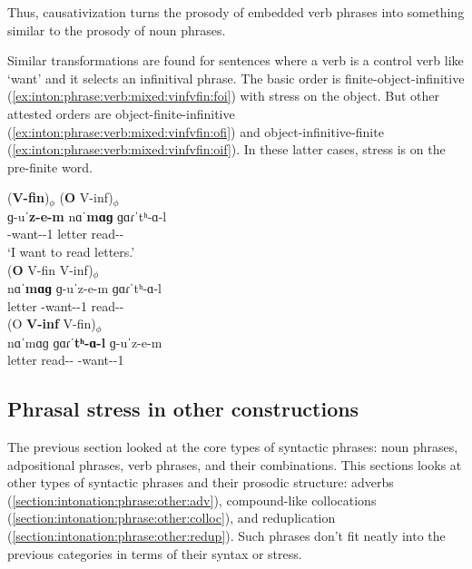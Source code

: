 Thus, causativization turns the prosody of embedded verb phrases into something similar to the prosody of noun phrases. 

Similar transformations are found for sentences where a verb is a control verb like `want' and it selects an infinitival phrase. The basic order is finite-object-infinitive (\ref{ex:inton:phrase:verb:mixed:vinfvfin:foi}) with stress on the object. But other attested orders are object-finite-infinitive (\ref{ex:inton:phrase:verb:mixed:vinfvfin:ofi}) and object-infinitive-finite (\ref{ex:inton:phrase:verb:mixed:vinfvfin:oif}). In these latter cases, stress is on the pre-finite word. 

\begin{exe}
	\ex \begin{xlist}
		\ex \glll (\textbf{V-fin})$_\phi$ (\textbf{O} V-inf)$_\phi$  \\
		ɡ-uˈ\textbf{z-e-m} nɑˈ\textbf{mɑɡ} ɡɑɾˈtʰ-ɑ-l \\
		{\ind}-want-{\thgloss}-1{\sg} letter read-{\thgloss}-{\infgloss} \\
		\trans `I want to read letters.' \label{ex:inton:phrase:verb:mixed:vinfvfin:foi} \\
		\ex \glll (\textbf{O} {V-fin} {V-inf})$_\phi$  \\
		nɑˈ\textbf{mɑɡ} ɡ-uˈ{z-e-m}  ɡɑɾˈ{tʰ-ɑ-l} \\
		letter {\ind}-want-{\thgloss}-1{\sg}  read-{\thgloss}-{\infgloss} \\
		 \label{ex:inton:phrase:verb:mixed:vinfvfin:ofi} 
		\ex \glll ({O} \textbf{V-inf}  V-fin)$_\phi$  \\
		nɑˈ{mɑɡ}  ɡɑɾˈ\textbf{tʰ-ɑ-l} ɡ-uˈ{z-e-m}  \\
		letter  read-{\thgloss}-{\infgloss} {\ind}-want-{\thgloss}-1{\sg}  \\
		 \label{ex:inton:phrase:verb:mixed:vinfvfin:oif} 
	\end{xlist}
\end{exe}

\subsection{Phrasal stress in other constructions}\label{section:intonation:phrase:other}
The previous section looked at the core types of syntactic phrases: noun phrases, adpositional phrases, verb phrases, and their combinations. This sections looks at other types of syntactic phrases and their prosodic structure: adverbs (\ref{section:intonation:phrase:other:adv}), compound-like collocations (\ref{section:intonation:phrase:other:colloc}), and reduplication (\ref{section:intonation:phrase:other:redup}). Such phrases don't fit neatly into the previous categories in terms of their syntax or stress. 

